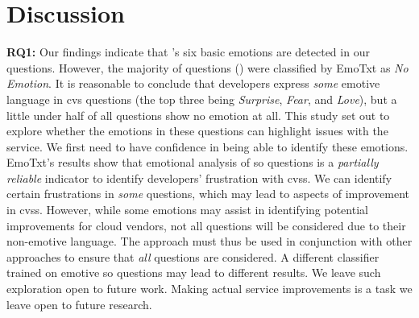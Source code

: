 {\begin{landscape}
\begin{table}
{\begin{tabular}{p{1\linewidth}p{0.2\linewidth}}
\bottomrule
\end{tabular}}
\end{table}\end{landscape}}

\section{Discussion}\label{semotion2021:sec:discussion}

\textbf{RQ1:} Our findings indicate that \citet{shaver1987}'s six basic emotions are detected in our questions. However, the majority of questions (\SEMPctNoEmotionAverage{}) were classified by EmoTxt as \textit{No Emotion}. It is reasonable to conclude that developers express \textit{some} emotive language in \gls{cvs} questions (the top three being \textit{Surprise}, \textit{Fear}, and \textit{Love}), but a little under half of all questions show no emotion at all. This study set out to explore whether the emotions in these questions can highlight issues with the service. We first need to have confidence in being able to identify these emotions. EmoTxt's results show that emotional analysis of \gls{so} questions is a \textit{partially reliable} indicator to identify developers' frustration with \glspl{cvs}. We can identify certain frustrations in \textit{some} questions, which may lead to aspects of improvement in \glspl{cvs}.  However, while some emotions may assist in identifying potential improvements for cloud vendors, not all questions will be considered due to their non-emotive language. The approach must thus be used in conjunction with other approaches to ensure that \textit{all} questions are considered. A different classifier trained on emotive \gls{so} questions may lead to different results. We leave such exploration open to future work. Making actual service improvements is a task we leave open to future research.

